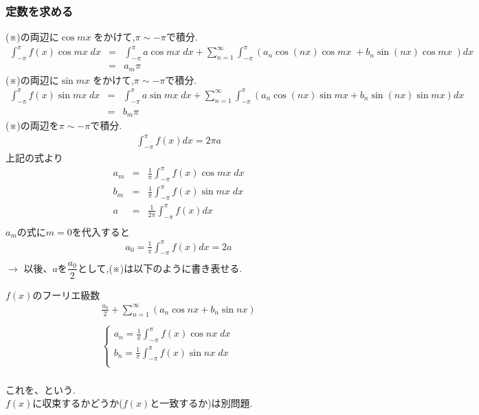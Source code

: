 \documentclass[a4paper]{jsarticle}
\begin{document}
\subsubsection{定数を求める}
(※)の両辺に$\cos mx \;$をかけて,$\pi \sim -\pi$で積分.\\
\begin{eqnarray*}
    \int^\pi_{-\pi}f\left(x\right)\cos mx \; dx
    &=& \int^\pi_{-\pi}a\cos  mx \; dx + \sum^\infty_{n=1}\int^\pi_{-\pi}\left(a_n \cos\left(nx\right) \cos mx \; + b_n \sin \left(nx\right) \cos mx \;\right) dx\\
    &=&a_m \pi
\end{eqnarray*}
(※)の両辺に$\sin mx \;$をかけて,$\pi \sim -\pi$で積分.\\
\begin{eqnarray*}
    \int^\pi_{-\pi}f\left(x\right)\sin mx \; dx
    &=& \int^\pi_{-\pi}a\sin mx \; dx + \sum^\infty_{n=1}\int^\pi_{-\pi}\left(a_n \cos\left(nx\right) \sin mx + b_n \sin \left(nx\right) \sin mx \right) dx\\
    &=&b_m \pi
\end{eqnarray*}
(※)の両辺を$\pi \sim -\pi$で積分.\\
\begin{eqnarray*}
    \int^\pi_{-\pi}f\left(x\right) dx= 2\pi a
\end{eqnarray*}
上記の式より
\begin{eqnarray*}
    a_m &=& \frac{1}{\pi} \int^\pi_{-\pi}f\left(x\right)\cos mx \; dx\\
    b_m &=& \frac{1}{\pi} \int^\pi_{-\pi}f\left(x\right)\sin mx \; dx\\
    a &=& \frac{1}{2\pi} \int^\pi_{-\pi}f\left(x\right)dx\\
\end{eqnarray*}
$a_m$の式に$m=0$を代入すると
\begin{eqnarray*}
    a_0 = \frac{1}{\pi} \int^\pi_{-\pi}f\left(x\right) dx = 2a\\
\end{eqnarray*}
$\rightarrow$ 以後、$a$を$\dfrac{a_0}{2}$として,(※)は以下のように書き表せる.
\begin{itembox}[l]{$f\left(x\right)$のフーリエ級数}
    \begin{eqnarray*}
        \frac{a_0}{2} + \sum^\infty_{n=1}\left(a_n \cos nx+b_n \sin nx\right)\\ \\
        \begin{cases}
            a_n = \displaystyle \frac{1}{\pi} \int^\pi_{-\pi}f\left(x\right)\cos nx \; dx \\
            b_n = \displaystyle \frac{1}{\pi} \int^\pi_{-\pi}f\left(x\right)\sin nx \; dx \\
        \end{cases}\\
    \end{eqnarray*}
    \begin{center}
        これを、という.\\
        $f\left(x\right)$に収束するかどうか($f\left(x\right)$と一致するか)は別問題.
    \end{center}
\end{itembox}
\end{document}
